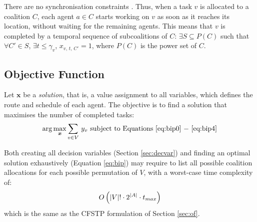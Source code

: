 There are no synchronisation constraints \cite{nunes2017taxonomy}. Thus, when a task $v$
is allocated to a coalition $C$, each agent $a \in C$ starts working on $v$ as soon as it
reaches its location, without waiting for the remaining agents. This means that $v$ is
completed by a temporal sequence of subcoalitions of $C$: $\exists S \subseteq P(C)$ such
that $\forall C' \in S$, $\exists t \leq \gamma_v$, $x_{v,\, t,\, C'} = 1$, where $P(C)$
is the power set of $C$.

\subsection{Objective Function}\label{sec:bip-of}

Let $\bm{x}$ be a \emph{solution}, that is, a value assignment to all variables, which
defines the route and schedule of each agent. The objective is to find a solution that
maximises the number of completed tasks:
\begin{equation}\label{eq:bip}
    \arg \max_{\bm{x}} \sum_{v \in V}\, y_v
    \text{ subject to Equations \ref{eq:bip0} $-$ \ref{eq:bip4}}
\end{equation}

Both creating all decision variables (Section \ref{sec:decvar}) and finding an optimal
solution exhaustively (Equation \ref{eq:bip}) may require to list all possible
coalition allocations for each possible permutation of $V$, with a worst-case time
complexity of:
\begin{equation}\label{eq:comp}
    O \left( |V|! \cdot 2^{|A|} \cdot t_{max} \right)
\end{equation}
which is the same as the CFSTP formulation of Section \ref{sec:of}.

